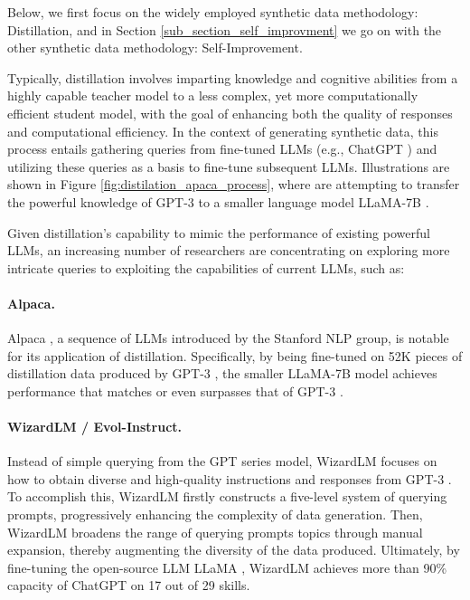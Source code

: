 \documentclass[11pt]{article}
\begin{document}
Below, we first focus on the widely employed synthetic data methodology: Distillation, and in Section \ref{sub_section_self_improvment} we go on with the other synthetic data methodology: Self-Improvement.

Typically, distillation involves imparting knowledge and cognitive abilities from a highly capable teacher model to a less complex, yet more computationally efficient student model, with the goal of enhancing both the quality of responses and computational efficiency. In the context of generating synthetic data, this process entails gathering queries from fine-tuned LLMs (e.g., ChatGPT \cite{chatgpt}) and utilizing these queries as a basis to fine-tune subsequent LLMs. Illustrations are shown in Figure \ref{fig:distilation_apaca_process}, where \citet{taori2023alpaca} are attempting to transfer the powerful knowledge of GPT-3 \cite{brown2020language} to a smaller language model LLaMA-7B \cite{Touvron2023LLaMAOA}.

Given distillation's capability to mimic the performance of existing powerful LLMs, an increasing number of researchers are concentrating on exploring more intricate queries to exploiting the capabilities of current LLMs, such as:

\paragraph{Alpaca.} Alpaca \cite{taori2023alpaca}, a sequence of LLMs introduced by the Stanford NLP group, is notable for its application of distillation. Specifically, by being fine-tuned on 52K pieces of distillation data produced by GPT-3 \cite{brown2020language}, the smaller LLaMA-7B \cite{Touvron2023LLaMAOA} model achieves performance that matches or even surpasses that of GPT-3 \cite{brown2020language}.

\paragraph{WizardLM / Evol-Instruct.}
\label{data:evol-instruct}
Instead of simple querying from the GPT series model, WizardLM \cite{xu2023wizardlm} focuses on how to obtain diverse and high-quality instructions and responses from GPT-3 \cite{brown2020language}. To accomplish this, WizardLM \cite{xu2023wizardlm} firstly constructs a five-level system of querying prompts, progressively enhancing the complexity of data generation. Then, WizardLM \cite{xu2023wizardlm} broadens the range of querying prompts topics through manual expansion, thereby augmenting the diversity of the data produced. Ultimately, by fine-tuning the open-source LLM LLaMA \cite{touvron2023llama}, WizardLM \cite{xu2023wizardlm} achieves more than 90\% capacity of ChatGPT \cite{chatgpt} on 17 out of 29 skills.
\end{document}
